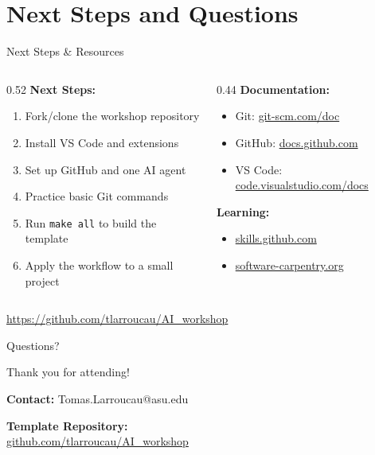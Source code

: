 \documentclass[11pt,aspectratio=169]{beamer}
\begin{document}
\section{Next Steps and Questions}

\begin{frame}{Next Steps \& Resources}
\begin{columns}[t]
\begin{column}{0.52\textwidth}
\textbf{Next Steps:}
\begin{enumerate}
    \item Fork/clone the workshop repository
    \item Install VS Code and extensions
    \item Set up GitHub and one AI agent
    \item Practice basic Git commands
    \item Run \texttt{make all} to build the template
    \item Apply the workflow to a small project
\end{enumerate}
\end{column}
\begin{column}{0.44\textwidth}
\textbf{Documentation:}
\begin{itemize}
    \item Git: \url{git-scm.com/doc}
    \item GitHub: \url{docs.github.com}
    \item VS Code: \url{code.visualstudio.com/docs}
\end{itemize}
\textbf{Learning:}
\begin{itemize}
    \item \url{skills.github.com}
    \item \url{software-carpentry.org}
\end{itemize}
\end{column}
\end{columns}
\vspace{0.2cm}
\url{https://github.com/tlarroucau/AI_workshop}
\end{frame}


\begin{frame}{Questions?}
\begin{center}
\Large
Thank you for attending!

\vspace{1cm}

\normalsize
\textbf{Contact:} Tomas.Larroucau@asu.edu

\vspace{0.5cm}

\textbf{Template Repository:} \\
\url{github.com/tlarroucau/AI_workshop}


\end{center}
\end{frame}
\end{document}
